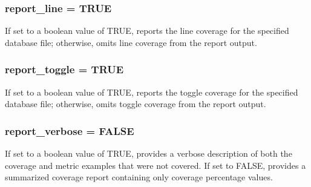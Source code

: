 \subsubsection{ report\_\-line = TRUE}\label{report_8c_a0}


If set to a boolean value of TRUE, reports the line coverage for the specified database file; otherwise, omits line coverage from the report output. 
\subsubsection{ report\_\-toggle = TRUE}\label{report_8c_a1}


If set to a boolean value of TRUE, reports the toggle coverage for the specified database file; otherwise, omits toggle coverage from the report output. 
\subsubsection{ report\_\-verbose = FALSE}\label{report_8c_a4}


If set to a boolean value of TRUE, provides a verbose description of both the coverage and metric examples that were not covered. If set to FALSE, provides a summarized coverage report containing only coverage percentage values. 